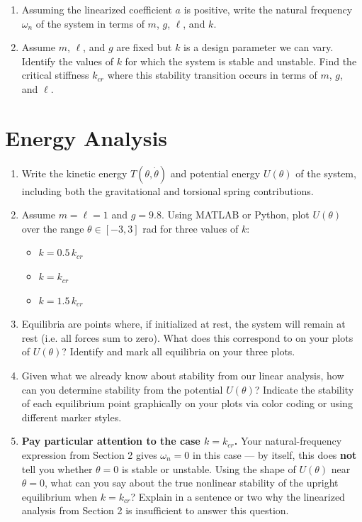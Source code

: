 \documentclass[11pt,letterpaper]{article}
\begin{document}
\begin{enumerate}[label=(\alph*)]
    \item Assuming the linearized coefficient $a$ is positive, write the natural frequency $\omega_n$ of the system in terms of $m$, $g$, $\ell$, and $k$.
    \item Assume $m$, $\ell$, and $g$ are fixed but $k$ is a design parameter we can vary. Identify the values of $k$ for which the system is stable and unstable. Find the critical stiffness $k_{cr}$ where this stability transition occurs in terms of $m$, $g$, and $\ell$.
\end{enumerate}

\section{Energy Analysis}

\begin{enumerate}[label=(\alph*)]
    \item Write the kinetic energy $T(\theta,\dot\theta)$ and potential energy $U(\theta)$ of the system, including both the gravitational and torsional spring contributions.
    \item Assume $m=\ell=1$ and $g=9.8$. Using MATLAB or Python, plot $U(\theta)$ over the range $\theta \in [-3,3]$ rad for three values of $k$:
    \begin{itemize}
        \item $k = 0.5\,k_{cr}$
        \item $k = k_{cr}$
        \item $k = 1.5\,k_{cr}$
    \end{itemize}
    \item Equilibria are points where, if initialized at rest, the system will remain at rest (i.e. all forces sum to zero). What does this correspond to on your plots of $U(\theta)$? Identify and mark all equilibria on your three plots.
    \item Given what we already know about stability from our linear analysis, how can you determine stability from the potential $U(\theta)$? Indicate the stability of each equilibrium point graphically on your plots via color coding or using different marker styles.
    \item \textbf{Pay particular attention to the case $k = k_{cr}$.} Your natural-frequency expression from Section 2 gives $\omega_n = 0$ in this case --- by itself, this does \textbf{not} tell you whether $\theta = 0$ is stable or unstable. Using the shape of $U(\theta)$ near $\theta = 0$, what can you say about the true nonlinear stability of the upright equilibrium when $k = k_{cr}$? Explain in a sentence or two why the linearized analysis from Section 2 is insufficient to answer this question.
\end{enumerate}
\end{document}

